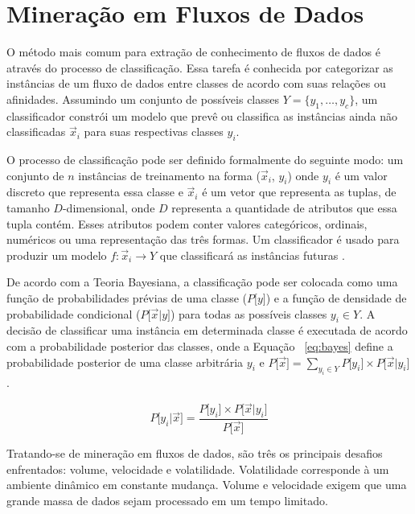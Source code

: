 \section{Mineração em Fluxos de Dados}\label{sec:mineracao_fluxos} 

O método mais comum para extração de conhecimento de fluxos de dados é através do processo de classificação. Essa tarefa é conhecida por categorizar as instâncias de um fluxo de dados entre classes de acordo com suas relações ou afinidades. Assumindo um conjunto de possíveis classes $Y = \{y_1, \ldots, y_c\}$, um classificador constrói um modelo que prevê ou classifica as instâncias ainda não classificadas $\vec{x}_i$ para suas respectivas classes $y_i$.


O processo de classificação pode ser definido formalmente do seguinte modo: um conjunto de $n$ instâncias de treinamento na forma ($\vec{x}_i$, $y_i$) onde $y_i$ é um valor discreto que representa essa classe e $\vec{x}_i$ é um vetor que representa as tuplas, de tamanho $D$-dimensional, onde $D$ representa a quantidade de atributos que essa tupla contém.  Esses atributos podem conter valores categóricos, ordinais, numéricos ou uma representação das três formas. Um classificador é usado para produzir um modelo $f:\vec{x}_i \rightarrow Y$ que classificará as instâncias futuras \cite{Barddal2017}.

De acordo com a Teoria Bayesiana, a classificação pode ser colocada como uma função de probabilidades prévias de uma classe ($P \big[ y \big]$) e a função de densidade de probabilidade condicional ($P \big[ \vec{x} \vert y \big]$) para todas as possíveis classes $y_i \in Y$. A decisão de classificar uma instância em determinada classe é executada de acordo com a probabilidade posterior das classes, onde a Equação ~\ref{eq:bayes} define a probabilidade posterior de uma classe arbitrária $y_i$ e $P  \big[ \vec{x} \big] = \sum_{y_i\in Y} P  \big[ y_i \big] \times P  \big[ \vec{x} \vert y_i \big]$.

\begin{equation}
P  \big[ y_i \vert \vec{x} \big] = \frac{P  \big[ y_i \big] \times P  \big[ \vec{x} \vert y_i \big]}{P  \big[ \vec{x} \big]}	
\label{eq:bayes}
\end{equation}


Tratando-se de mineração em fluxos de dados, são três os principais desafios enfrentados: volume, velocidade e volatilidade. Volatilidade corresponde à um ambiente dinâmico em constante mudança. Volume e velocidade exigem que uma grande massa de dados sejam processado em um tempo limitado. 

